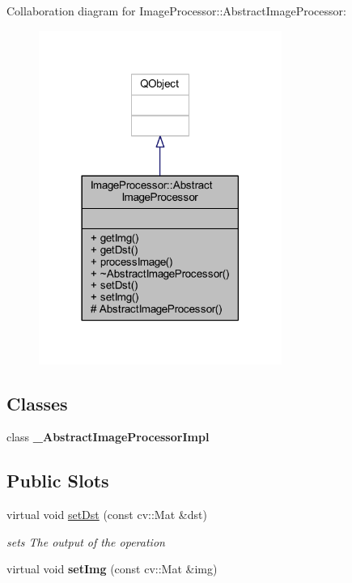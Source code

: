 Collaboration diagram for Image\+Processor\+:\+:Abstract\+Image\+Processor\+:\nopagebreak
\begin{figure}[H]
\begin{center}
\leavevmode
\includegraphics[width=225pt]{d2/d0a/class_image_processor_1_1_abstract_image_processor__coll__graph}
\end{center}
\end{figure}
\subsection*{Classes}
\begin{DoxyCompactItemize}
\item 
class {\bfseries \+\_\+\+Abstract\+Image\+Processor\+Impl}
\end{DoxyCompactItemize}
\subsection*{Public Slots}
\begin{DoxyCompactItemize}
\item 
virtual void \hyperlink{class_image_processor_1_1_abstract_image_processor_a8d9dcbea1b426f4accdd8fcc650eb6ab}{set\+Dst} (const cv\+::\+Mat \&dst)
\begin{DoxyCompactList}\small\item\em sets The output of the operation \end{DoxyCompactList}\item 
\mbox{\label{class_image_processor_1_1_abstract_image_processor_a08c1e75c34cb5724e8b3ed4e55d90fb9}} 
virtual void {\bfseries set\+Img} (const cv\+::\+Mat \&img)
\end{DoxyCompactItemize}
